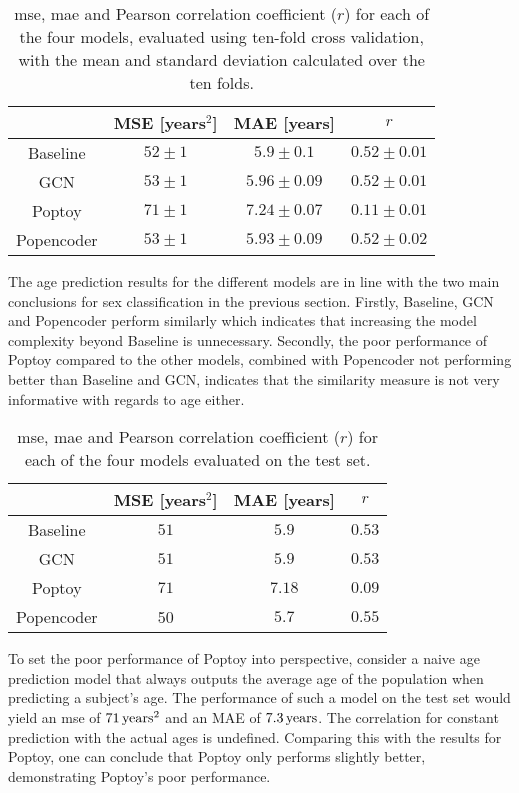 \begin{table}[!htbp]
    \centering
    \caption{\acrfull{mse}, \acrfull{mae} and Pearson correlation coefficient ($r$) for each of the four models, evaluated using ten-fold cross validation, with the mean and standard deviation calculated over the ten folds.}
    \begin{tabular}{c|c|c|c}
         &  MSE [years$^2$]& MAE [years] & $r$ \\ \hline 
        Baseline &$52\pm1$& $5.9\pm0.1$&$0.52\pm0.01$\\
        GCN & $53\pm1$& $5.96\pm 0.09 $& $0.52\pm0.01$\\
        Poptoy &$71\pm 1$ & $7.24\pm0.07$ &$ 0.11\pm 0.01$\\
        Popencoder &$53\pm1$& $5.93\pm 0.09$ & $0.52\pm0.02$\\
    \end{tabular}
    \label{tab:age_model_results}
\end{table}

The age prediction results for the different models are in line with the two main conclusions for sex classification in the previous section. Firstly, Baseline, GCN and Popencoder perform similarly which indicates that increasing the model complexity beyond Baseline is unnecessary. Secondly, the poor performance of Poptoy compared to the other models, combined with Popencoder not performing better than Baseline and GCN, indicates that the similarity measure is not very informative with regards to age either. 

\begin{table}[!htbp]
    \centering
    \caption{\acrfull{mse}, \acrfull{mae} and Pearson correlation coefficient ($r$) for each of the four models evaluated on the test set.}
    \begin{tabular}{c|c|c|c}
         &  MSE [years$^2$]& MAE [years] & $r$ \\ \hline 
        Baseline & $51 $& $5.9 $&$0.53 $\\
        GCN & $51 $& $5.9  $& $0.53 $\\
        Poptoy &$71 $ & $7.18 $ &$ 0.09 $\\
        Popencoder &50 & $5.7 $ & $0.55 $\\
    \end{tabular}
    \label{tab:age_final_model_results}
\end{table}

To set the poor performance of Poptoy into perspective, consider a naive age prediction model that always outputs the average age of the population when predicting a subject's age. The performance of such a model on the test set would yield an \acrshort{mse} of $71\rm\,years^2$ and an MAE of $7.3\rm\,years$. The correlation for constant prediction with the actual ages is undefined. Comparing this with the results for Poptoy, one can conclude that Poptoy only performs slightly better, demonstrating Poptoy's poor performance.


